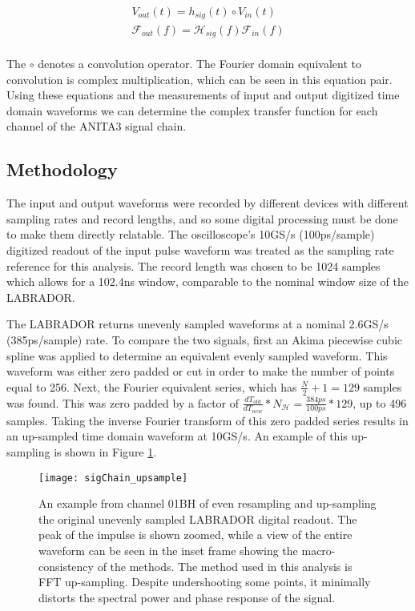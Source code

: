 \begin{equation}
\begin{split}
V_{out}(t) = h_{sig}(t) \circ V_{in}(t) \\
\mathcal{F}_{out}(f) = \mathcal{H}_{sig}(f) \mathcal{F}_{in}(f) \\
\label{eqn:ComplexTF}
\end{split}
\end{equation}

The $\circ$ denotes a convolution operator.  The Fourier domain equivalent to convolution is complex multiplication, which can be seen in this equation pair.  Using these equations and the measurements of input and output digitized time domain waveforms we can determine the complex transfer function for each channel of the ANITA3 signal chain.


	\subsection{Methodology}
		The input and output waveforms were recorded by different devices with different sampling rates and record lengths, and so some digital processing must be done to make them directly relatable.  The oscilloscope's 10GS/s (100ps/sample) digitized readout of the input pulse waveform was treated as the sampling rate reference for this analysis.  The record length was chosen to be 1024 samples which allows for a 102.4ns window, comparable to the nominal window size of the LABRADOR.
		
		The LABRADOR returns unevenly sampled waveforms at a nominal 2.6GS/s (385ps/sample) rate.  To compare the two signals, first an Akima piecewise cubic spline was applied to determine an equivalent evenly sampled waveform.  This waveform was either zero padded or cut in order to make the number of points equal to 256.  Next, the Fourier equivalent series, which has $\frac{N}{2}+1 = 129$ samples was found. This was zero padded by a factor of $\frac{dT_{old}}{dT_{new}}*N_{\mathcal{H}} = \frac{384ps}{100ps}*129$, up to 496 samples.  Taking the inverse Fourier transform of this zero padded series results in an up-sampled time domain waveform at 10GS/s.  An example of this up-sampling is shown in Figure \ref{fig:sigChain_upsample}.
		
\begin{figure}
\centering
	\texttt{[image: sigChain\_upsample]}
	\caption{An example from channel 01BH of even resampling and up-sampling the original unevenly sampled LABRADOR digital readout.  The peak of the impulse is shown zoomed, while a view of the entire waveform can be seen in the inset frame showing the macro-consistency of the methods.  The method used in this analysis is  FFT up-sampling.  Despite undershooting some points, it minimally distorts the spectral power and phase response of the signal.}
\label{fig:sigChain_upsample}
\end{figure}			
		
